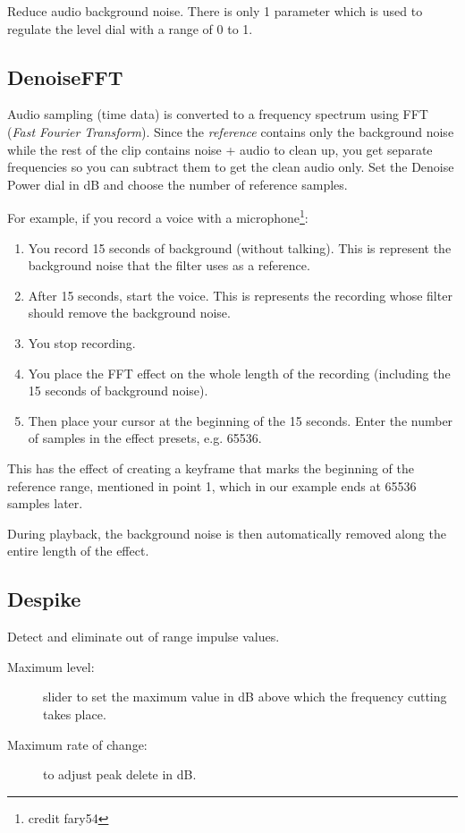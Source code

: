 Reduce audio background noise. There is only 1 parameter which is used to regulate the level dial with a range of 0 to 1.

\subsection{DenoiseFFT}%
\label{sub:denoisefft}

Audio sampling (time data) is converted to a frequency spectrum using FFT (\textit{Fast Fourier Transform}). Since the \textit{reference} contains only the background noise while the rest of the clip contains noise + audio to clean up, you get separate frequencies so you can subtract them to get the clean audio only. Set the Denoise Power dial in dB and choose the number of reference samples.

For example, if you record a voice with a microphone\protect\footnote{credit fary54}:
\begin{enumerate}
        \item You record 15 seconds of background (without talking). This is represent the background noise that the filter uses as a reference.
        \item After 15 seconds, start the voice. This is represents the recording whose filter should remove the background noise.
        \item You stop recording.
        \item You place the FFT effect on the whole length of the recording (including the 15 seconds of background noise).
        \item Then place your cursor at the beginning of the 15 seconds. Enter the number of samples in the effect presets, e.g. 65536.
\end{enumerate}

This has the effect of creating a keyframe that marks the beginning of the reference range, mentioned in point 1, which in our example ends at 65536 samples later.

During playback, the background noise is then automatically removed along the entire length of the effect.

\subsection{Despike}%
\label{sub:despike}

Detect and eliminate out of range impulse values.

\begin{description}
    \item[Maximum level:] slider to set the maximum value in dB above which the frequency cutting takes place.
    \item[Maximum rate of change:] to adjust peak delete in dB.
\end{description}

